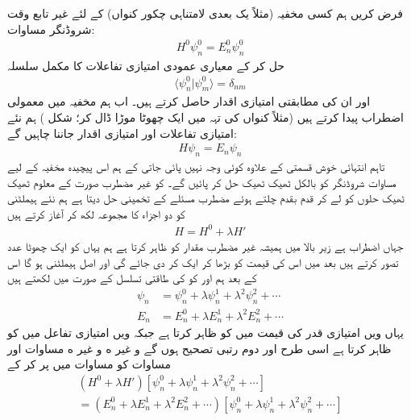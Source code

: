 
فرض کریں ہم کسی مخفیہ (مثلاً   یک  بعدی لامتناہی چکور کنواں) کے لئے غیر تابع وقت شروڈنگر مساوات:
\begin{align}\label{مساوات_اضطراب_پہلی}
H^0\psi_n^0=E_n^0\psi_n^0
\end{align}
حل کر کے معیاری عمودی امتیازی تفاعلات  کا مکمل سلسلہ
\begin{align}
\langle \psi_n^0 | \psi_m^0 \rangle = \delta_{nm}
\end{align}
اور ان کی مطابقتی امتیازی اقدار  حاصل کرتے ہیں۔ اب ہم مخفیہ میں معمولی اضطراب پیدا کرتے ہیں (مثلاً کنواں کی تہہ میں ایک چھوٹا موڑا ڈال کر؛  شکل  ) ہم  نئے  امتیازی تفاعلات اور امتیازی اقدار جاننا چاہیں گے: 
\begin{align}\label{مساوات_اضطراب_بنیادی}
H\psi_n = E_n\psi_n
\end{align}
تاہم انتہائی خوش قسمتی کے علاوہ  کوئی وجہ   نہیں  پائی  جاتی کے ہم اس  پیچیدہ مخفیہ کے لیے مساوات شروڈنگر کو بالکل ٹھیک ٹھیک حل کر  پائیں  گے۔  کو    غیر  مضطرب صورت کے معلوم ٹھیک ٹھیک حلوں کو لے کر قدم بقدم چلتے ہوئے مضطرب مسئلے کے تخمینی حل دیتا ہے ہم نئے  ہیملٹنی کو دو اجزاء کا  مجموعہ لکھ کر آغاز کرتے ہیں 
\begin{align}
H = H^0 + \lambda H'
\end{align}
جہاں  اضطراب ہے زیر بالا میں  ہمیشہ  غیر  مضطرب مقدار کو ظاہر کرتا ہے ہم یہاں  کو ایک چھوٹا عدد تصور کرتے ہیں بعد میں اس کی قیمت کو بڑھا کر ایک  کر دی جائے گی اور  اصل ہیملٹنی ہو گا اس کے بعد ہم  اور  کو  کی طاقتی تسلسل کے صورت میں لکھتے ہیں 
\begin{align}
\psi_n &= \psi_n^0 + \lambda\psi_n^1 + \lambda^2\psi_n^2+\cdots \label{مساوات_اضطراب_سائے_این}\\
E_n &= E_n^0 + \lambda E_n^1 + \lambda^2 E_n^2+\cdots \label{مساوات_اضطراب_ای_این}
\end{align} 
یہاں  ویں امتیازی قدر کی قیمت میں  کو  ظاہر کرتا ہے جبکہ  ویں امتیازی تفاعل میں  کو   ظاہر کرتا ہے اسی طرح  اور  دوم رتبی تصحيح ہوں گے و غیر ه و  غیر ه مساوات  اور مساوات  کو مساوات  میں پر کر کے 
\begin{multline*}
(H^0 + \lambda H')[\psi_n^0 + \lambda \psi_n^1 + \lambda^2 \psi_n^2 + \cdots]\\
= (E_n^0 + \lambda E_n^1 + \lambda^2 E_n^2 + \cdots)[\psi_n^0 + \lambda \psi_n^1 + \lambda^2 \psi_n^2 + \cdots]
\end{multline*}
